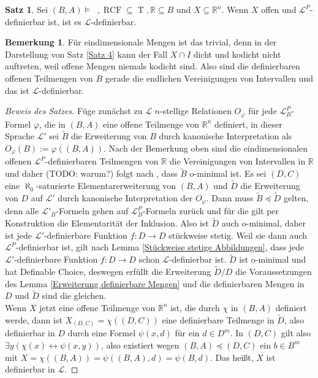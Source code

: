 \documentclass[a4paper, 11pt]{report}
\newcommand{\lingua}{\mathcal{L}}
\newcommand{\setR}{\mathbb{R}}
\DeclareMathOperator{\td}{T^d}
\theoremstyle{definition}
\newtheorem{theorem}[subsection]{Satz}
\newtheorem*{remark}{Bemerkung}
\begin{document}
\begin{theorem}
	Sei $(B,A)\models\td,\operatorname{RCF}\subseteq\operatorname{T},\setR\subseteq B$ und $X\subseteq \setR^n$. Wenn $X$ offen und $\lingua^P$-definierbar ist, ist es $\lingua$-definierbar.
\end{theorem}
\begin{remark}
	Für eindimensionale Mengen ist das trivial, denn in der Darstellung von Satz \ref{Satz 4} kann der Fall $X\cap I$ dicht und kodicht nicht auftreten, weil offene Mengen niemals kodicht sind. Also sind die definierbaren offenen Teilmengen von $B$ gerade die endlichen Vereinigungen von Intervallen und das ist $\lingua$-definierbar.
\end{remark}
\begin{proof}[Beweis des Satzes]
	Füge zunächst zu $\lingua$ $n$-stellige Relationen $O_\varphi$ für jede $\lingua^P_B$-Formel $\varphi$, die in $(B,A)$ eine offene Teilmenge von $\setR^n$ definiert, in dieser Sprache $\lingua'$ sei $\tilde{B}$ die Erweiterung von $B$ durch kanonische Interpretation als $O_\varphi(B):=\varphi((B,A))$. Nach der Bemerkung oben sind die eindimensionalen offenen $\lingua^P$-definierbaren Teilmengen von $\setR$ die Vereinigungen von Intervallen in $\setR$ und daher (TODO: warum?) folgt nach \cite{MillSpeiss}, dass $\tilde{B}$ o-minimal ist. Es sei $(D,C)$ eine $\aleph_0$-saturierte Elementarerweiterung von $(B,A)$ und $\tilde{D}$ die Erweiterung von $D$ auf $\lingua'$ durch kanonische Interpretation der $O_\varphi$. Dann muss $\tilde{B}\preceq\tilde{D}$ gelten, denn alle $\lingua'_B$-Formeln gehen auf $\lingua^P_B$-Formeln zurück und für die gilt per Konstruktion die Elementarität der Inklusion. Also ist $\tilde{D}$ auch o-minimal, daher ist jede $\lingua'$-definierbare Funktion $f:D\rightarrow D$ stückweise stetig. Weil sie dann auch $\lingua^P$-definierbar ist, gilt nach Lemma \ref{Stückweise stetige Abbildungen}, dass jede $\lingua'$-definierbare Funktion $f:D\rightarrow D$ schon $\lingua$-definierbar ist. $\tilde{D}$ ist o-minimal und hat Definable Choice, deswegen erfüllt die Erweiterung $\tilde{D}/D$ die Voraussetzungen des Lemma \ref{Erweiterung definierbare Mengen} und die definierbaren Mengen in $D$ und $\tilde{D}$ sind die gleichen.\\
	Wenn $X$ jetzt eine offene Teilmenge von $\setR^n$ ist, die durch $\chi$ in $(B,A)$ definiert werde, dann ist $X_{(D,C)}=\chi((D,C))$ eine definierbare Teilmenge in $\tilde{D}$, also definierbar in $D$ durch eine Formel $\psi(x,d)$ für ein $d\in D^m$. In $(D,C)$ gilt also $\exists y(\chi(x)\leftrightarrow\psi(x,y))$, also existiert wegen $(B,A)\preceq(D,C)$ ein $b\in B^m$ mit $X=\chi((B,A))=\psi((B,A),d)=\psi(B,d)$. Das heißt, $X$ ist definierbar in $\lingua$.
\end{proof}
\end{document}
